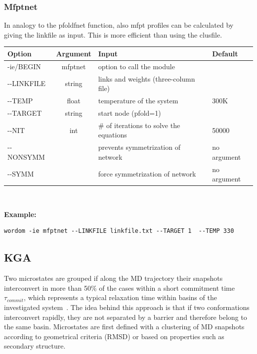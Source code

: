 \documentclass[11pt,twoside,onecolumn,a4paper,openright,notitlepage]{book}[2001/04/21]
\begin{document}
\subsubsection{Mfptnet}

In analogy to the pfoldfnet function, also mfpt profiles can be calculated by giving the linkfile as input. This is more efficient than using the clusfile.\\

\noindent\begin{tabular}{l|c|l|l}
Option & Argument & Input & Default \\
\hline
-ie/BEGIN    & mfptnet& option to call the module\\
-{}-LINKFILE & string & links and weights (three-column file) \\
-{}-TEMP     & float  & temperature of the system & 300K \\
-{}-TARGET   & string & start node (pfold=1) \\
-{}-NIT      & int    & \# of iterations to solve the equations & 50000\\
-{}-NONSYMM  &       &  prevents symmetrization of network & no argument\\
-{}-SYMM     &        &  force symmetrization of network & no argument\\
\end{tabular}\\
\vspace{3mm}

{\bf Example:}

\begin{verbatim}wordom -ie mfptnet --LINKFILE linkfile.txt --TARGET 1  --TEMP 330 \end{verbatim}
\subsection{KGA}
Two microstates are grouped if along the MD trajectory their snapshots interconvert in more than 50\% of the cases within a short commitment time $\tau_{commit}$, which represents a typical relaxation time within basins of the investigated system~\cite{Muff:Kinetic}. The idea behind this approach is that if two conformations interconvert rapidly, they are not separated by a barrier and therefore belong to the same basin. Microstates are first defined with a clustering of MD snapshots according to geometrical criteria (RMSD) or based on properties such as secondary structure.
\end{document}

